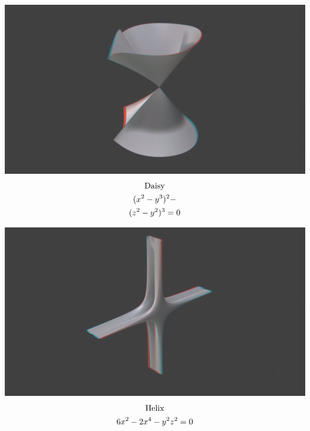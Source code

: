 \documentclass[paperwidth=46in, paperheight = 33.11in]{baposter}%
\begin{document}
\begin{poster}
{\begin{center}
\begin{minipage}[t]{0.48\linewidth}
    \begin{center}
        \includegraphics[width=1.02\linewidth, scale = 0.5]{pictures/daisy}
        \begin{gather*}
               \textnormal{Daisy}\\
        (x^2-y^3)^2 - \\ (z^2-y^2)^3=0
        \\
        \end{gather*}
    \end{center}
\end{minipage}
\hspace{0.01\linewidth}
\begin{minipage}[t]{0.48\linewidth}
    \begin{center}
        \includegraphics[width=1.02\linewidth, scale = 0.5]{pictures/helix}
        \begin{gather*}
           \textnormal{Helix}\\
        6x^2-2x^4-y^2z^2=0
        \end{gather*}
    \end{center}
\end{minipage}
    \end{center}
    
}
\end{poster}
\end{document}

